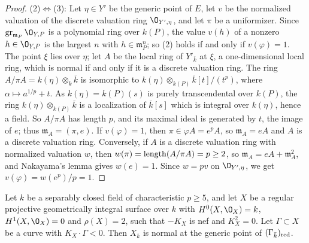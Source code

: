 \begin{proof}
(2)$\Leftrightarrow$(3): Let $\eta\in Y'$ be the generic point of $E$, let $v$ be the normalized valuation of the discrete valuation ring $\O_{Y',\eta}$, and let $\pi$ be a uniformizer.
Since $\operatorname{gr}_{\mathfrak m_P}\O_{Y,P}$ is a polynomial ring over $k(P)$, the value $v(h)$ of a nonzero $h\in\O_{Y,P}$ is the largest $n$ with $h\in\mathfrak m_P^n$; so (2) holds if and only if $v(\varphi) = 1$.
The point $\xi$ lies over $\eta$; let $A$ be the local ring of $Y'_{\bar k}$ at $\xi$, a one-dimensional local ring, which is normal if and only if it is a discrete valuation ring.
The ring $A/\pi A = k(\eta)\otimes_k\overline k$ is isomorphic to $k(\eta)\otimes_{k(P)}\overline k[t]/(t^p)$, where $\alpha\mapsto a^{1/p}+t$.
As $k(\eta) = k(P)(s)$ is purely transcendental over $k(P)$, the ring $k(\eta)\otimes_{k(P)}\overline k$ is a localization of $\overline k[s]$ which is integral over $k(\eta)$, hence a field.
So $A/\pi A$ has length $p$, and its maximal ideal is generated by $t$, the image of $e$; thus $\mathfrak m_A = (\pi,e)$.
If $v(\varphi) = 1$, then $\pi\in\varphi A = e^pA$, so $\mathfrak m_A = eA$ and $A$ is a discrete valuation ring.
Conversely, if $A$ is a discrete valuation ring with normalized valuation $w$, then $w(\pi) = \operatorname{length}(A/\pi A) = p\geq 2$, so $\mathfrak m_A = eA+\mathfrak m_A^2$, and Nakayama's lemma gives $w(e) = 1$.
Since $w = pv$ on $\O_{Y',\eta}$, we get $v(\varphi) = w(e^p)/p = 1$.
\end{proof}

\begin{lemma}\label{lem:nef-K2-zero}
Let $k$ be a separably closed field of characteristic $p\geq 5$, and let $X$ be a regular projective geometrically integral surface over $k$ with $H^0(X,\O_X) = k$, $H^1(X,\O_X) = 0$ and $\rho(X) = 2$, such that $-K_X$ is nef and $K_X^2 = 0$.
Let $\Gamma\subset X$ be a curve with $K_X\cdot\Gamma<0$.
Then $X_{\bar k}$ is normal at the generic point of $(\Gamma_{\bar k})_{\rm red}$.
\end{lemma}

